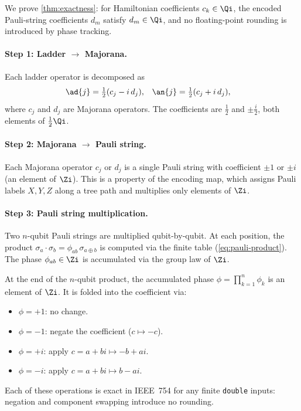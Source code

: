 
We prove \cref{thm:exactness}: for Hamiltonian coefficients
$c_k \in \Qi$, the encoded Pauli-string coefficients $d_m$ satisfy
$d_m \in \Qi$, and no floating-point rounding is introduced by phase
tracking.

\paragraph{Step 1: Ladder $\to$ Majorana.}
Each ladder operator is decomposed as
\begin{align}
  \ad{j} &= \tfrac{1}{2}(c_j - i\,d_j), &
  \an{j} &= \tfrac{1}{2}(c_j + i\,d_j),
\end{align}
where $c_j$ and $d_j$ are Majorana operators.  The coefficients are
$\tfrac{1}{2}$ and $\pm\tfrac{i}{2}$, both elements of
$\tfrac{1}{2}\Qi$.

\paragraph{Step 2: Majorana $\to$ Pauli string.}
Each Majorana operator $c_j$ or $d_j$ is a single Pauli string
with coefficient $\pm 1$ or $\pm i$ (an element of $\Zi$).  This
is a property of the encoding map, which assigns Pauli labels
$X, Y, Z$ along a tree path and multiplies only elements of $\Zi$.

\paragraph{Step 3: Pauli string multiplication.}
Two $n$-qubit Pauli strings are multiplied qubit-by-qubit.  At each
position, the product $\sigma_a \cdot \sigma_b = \phi_{ab} \,
\sigma_{a \oplus b}$ is computed via the finite table
(\cref{eq:pauli-product}).  The phase $\phi_{ab} \in \Zi$ is
accumulated via the group law of $\Zi$.

At the end of the $n$-qubit product, the accumulated phase
$\phi = \prod_{k=1}^{n} \phi_k$ is an element of $\Zi$.  It is
folded into the coefficient via:
\begin{itemize}
  \item $\phi = +1$: no change.
  \item $\phi = -1$: negate the coefficient ($c \mapsto -c$).
  \item $\phi = +i$: apply $c = a + bi \mapsto -b + ai$.
  \item $\phi = -i$: apply $c = a + bi \mapsto b - ai$.
\end{itemize}
Each of these operations is exact in IEEE~754 for any finite
\texttt{double} inputs: negation and component swapping introduce
no rounding.

